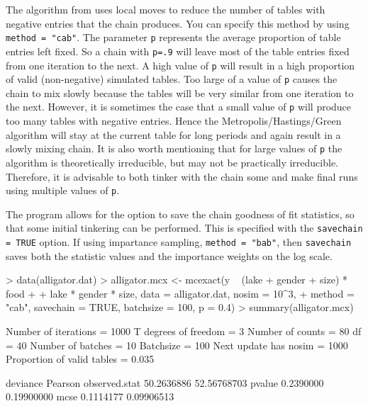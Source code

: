 \documentclass[a4paper]{article}
\begin{document}
The algorithm from \cite{caffo:booth:2000} uses local moves to reduce
the number of tables with negative entries that the chain produces.
You can specify this method by using \texttt{method = "cab"}. The
parameter \texttt{p} represents the average proportion of table
entries left fixed. So a chain with \texttt{p=.9} will leave most of
the table entries fixed from one iteration to the next. A high value
of \texttt{p} will result in a high proportion of valid (non-negative)
simulated tables. Too large of a value of \texttt{p} causes the chain
to mix slowly because the tables will be very similar from one
iteration to the next. However, it is sometimes the case that a small
value of \texttt{p} will produce too many tables with negative
entries. Hence the Metropolis/Hastings/Green algorithm will stay at
the current table for long periods and again result in a slowly mixing
chain.  It is also worth mentioning that for large values of
\texttt{p} the algorithm is theoretically irreducible, but may not be
practically irreducible. Therefore, it is advisable to both tinker
with the chain some and make final runs using multiple values of
\texttt{p}.

The program allows for the option to save the chain goodness of fit
statistics, so that some initial tinkering can be performed.  This is
specified with the \texttt{savechain = TRUE} option. If using
impartance sampling, \texttt{method = "bab"}, then \texttt{savechain}
saves both the statistic values and the importance weights on the log
scale.
\begin{Schunk}
\begin{Sinput}
> data(alligator.dat)
> alligator.mcx <- mcexact(y ~ (lake + gender + size) * food + 
+     lake * gender * size, data = alligator.dat, nosim = 10^3, 
+     method = "cab", savechain = TRUE, batchsize = 100, p = 0.4)
> summary(alligator.mcx)
\end{Sinput}
\begin{Soutput}
Number of iterations       =  1000 
T degrees of freedom       =  3 
Number of counts           =  80 
df                         =  40 
Number of batches          =  10 
Batchsize                  =  100 
Next update has nosim      =  1000 
Proportion of valid tables =  0.035 

                deviance     Pearson
observed.stat 50.2636886 52.56768703
pvalue         0.2390000  0.19900000
mcse           0.1114177  0.09906513
\end{Soutput}
\end{Schunk}
\end{document}
